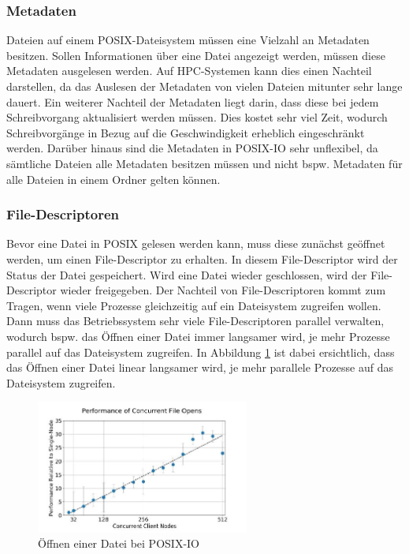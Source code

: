 \subsubsection{Metadaten}
Dateien auf einem POSIX-Dateisystem m\"ussen eine Vielzahl an Metadaten besitzen. Sollen Informationen \"uber eine Datei angezeigt werden, m\"ussen diese Metadaten ausgelesen werden. Auf HPC-Systemen kann dies einen Nachteil darstellen, da das Auslesen der Metadaten von vielen Dateien mitunter sehr lange dauert\cite{Layton.02.03.2010}.\newline
Ein weiterer Nachteil der Metadaten liegt darin, dass diese bei jedem Schreibvorgang aktualisiert werden m\"ussen. Dies kostet sehr viel Zeit, wodurch Schreibvorg\"ange in Bezug auf die Geschwindigkeit erheblich eingeschr\"ankt werden.\newline
Dar\"uber hinaus sind die Metadaten in POSIX-IO sehr unflexibel, da s\"amtliche Dateien alle Metadaten besitzen m\"ussen und nicht bspw. Metadaten f\"ur alle Dateien in einem Ordner gelten k\"onnen.
\subsubsection{File-Descriptoren}
Bevor eine Datei in POSIX gelesen werden kann, muss diese zun\"achst ge\"offnet werden, um einen File-Descriptor zu erhalten. In diesem File-Descriptor wird der Status der Datei gespeichert. Wird eine Datei wieder geschlossen, wird der File-Descriptor wieder freigegeben.\newline
Der Nachteil von File-Descriptoren kommt zum Tragen, wenn viele Prozesse gleichzeitig auf ein Dateisystem zugreifen wollen. Dann muss das Betriebssystem sehr viele File-Descriptoren parallel verwalten, wodurch bspw. das \"Offnen einer Datei immer langsamer wird, je mehr Prozesse parallel auf das Dateisystem zugreifen. In Abbildung \ref{fig:posix} ist dabei ersichtlich, dass das \"Offnen einer Datei linear langsamer wird, je mehr parallele Prozesse auf das Dateisystem zugreifen.
\begin{figure}[h]
	\centering
	\includegraphics[width=7cm]{fig/PosixIO.JPG}
	\caption{\"Offnen einer Datei bei POSIX-IO \cite{Lockwood.11.09.2017}}
	\label{fig:posix}
\end{figure}
